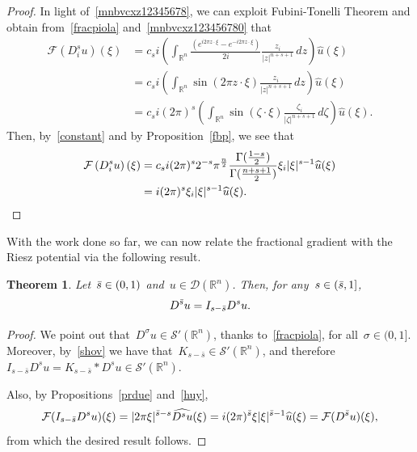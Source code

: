 \documentclass[11pt,hyp,]{nyjm}
\numberwithin{equation}{section}
\newcommand{\R}{\mathbb{R}}
\newtheorem{theorem}{Theorem}[section]
\theoremstyle{remark}
\newcommand{\Int}{\int_{\mathbb{R}^n}}
\newcommand{\bs}{\Bar{s}}
\begin{document}
\begin{proof}
In light of~\eqref{mnbvcxz12345678}, we can exploit Fubini-Tonelli Theorem and obtain from~\eqref{fracpiola} and~\eqref{mnbvcxz123456780} that
\begin{align*}
\mathcal{F}\left(D^s_i u\right)(\xi) &=  c_s i \left( \Int \frac{\left( e^{i 2 \pi z \cdot \xi} - e^{- i 2 \pi z \cdot \xi} \right)}{2i} \frac{z_i}{|z|^{n+s+1}} \, dz \right) \widehat{u} (\xi) \\ &= c_s i \left( \int_{\R^n} \sin(2 \pi z \cdot \xi) \frac{z_i}{|z|^{n+s+1}} \, dz \right) \widehat{u} (\xi)\\ &= c_s i (2\pi)^s \left( \int_{\R^n} \sin(\zeta \cdot \xi) \frac{\zeta_i}{|\zeta|^{n+s+1}} \, d\zeta \right) \widehat{u} (\xi).
\end{align*}
Then, by~\eqref{constant} and by Proposition~\ref{fbp}, we see that
\begin{equation*}\begin{split}
\mathcal{F}\left(D^s_i u\right)(\xi) &= c_si (2\pi)^s 2^{-s}\pi^{\frac{n}{2}} \frac{\Gamma(\frac{1-s}{2})}{\Gamma(\frac{n+s+1}{2})}\xi_i |\xi|^{s-1} \widehat{u} (\xi) 
\\&= i (2\pi)^s \xi_i |\xi|^{s-1} \widehat{u} (\xi). \qedhere\end{split}
\end{equation*}
\end{proof}
			
With the work done so far, we can now relate the fractional gradient with the Riesz potential via the following result. 
			
			\begin{theorem}\label{usacchialo}
				Let~$\Bar{s} \in (0,1)$ and~$u \in \mathcal{D}(\R^n)$. Then, for any~$s \in (\bs,1]$,
				\begin{equation}\label{imp}
					D^{\bs} u= I_{s-\bs} D^s u.
				\end{equation}
			\end{theorem}
			
			\begin{proof}
We point out that~$D^\sigma u \in \mathcal{S}'(\R^n)$, thanks to~\eqref{fracpiola},
for all~$\sigma\in(0,1]$. Moreover,	 by~\eqref{shov} we have that~$K_{s-\bar s} \in \mathcal{S}'(\R^n)$, and therefore~$I_{s-\bar s} D^su =K_{s-\bar s} \ast D^su \in \mathcal{S}'(\R^n)$. 

Also, by Propositions~\ref{prdue} and~\ref{huy},
$$
\mathcal{F}(I_{s-\bar s}D^s u) (\xi)= | 2 \pi \xi|^{\bar s-s}\widehat{D^su}(\xi)
= i( 2 \pi)^{\bar s} \xi|\xi|^{\bar s-1}\widehat u(\xi) = \mathcal{F}(D^ {\bs} u)(\xi),
$$
from which the desired result follows.
			\end{proof}
\end{document}
